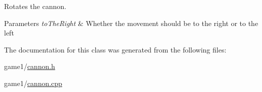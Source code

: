 \-Rotates the cannon. 


\begin{DoxyParams}{\-Parameters}
{\em to\-The\-Right} & \-Whether the movement should be to the right or to the left \\
\hline
\end{DoxyParams}


\-The documentation for this class was generated from the following files\-:\begin{DoxyCompactItemize}
\item 
game1/\hyperlink{cannon_8h}{cannon.\-h}\item 
game1/\hyperlink{cannon_8cpp}{cannon.\-cpp}\end{DoxyCompactItemize}

